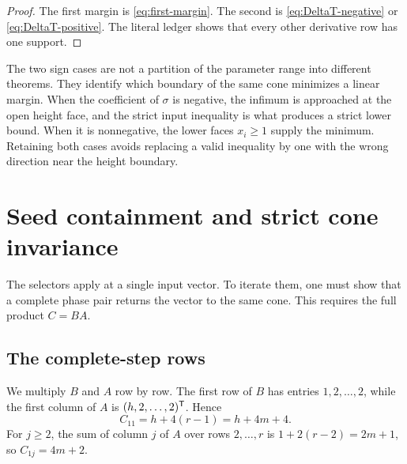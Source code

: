 \documentclass[11pt]{article}
\theoremstyle{remark}
\numberwithin{equation}{section}
\begin{document}
\begin{proof}
The first margin is \eqref{eq:first-margin}.  The second is
\eqref{eq:DeltaT-negative} or \eqref{eq:DeltaT-positive}.  The literal
ledger shows that every other derivative row has one support.
\end{proof}

The two sign cases are not a partition of the parameter range into different
theorems.  They identify which boundary of the same cone minimizes a linear
margin.  When the coefficient of \(\sigma\) is negative, the infimum is
approached at the open height face, and the strict input inequality is what
produces a strict lower bound.  When it is nonnegative, the lower faces
\(x_i\geq1\) supply the minimum.  Retaining both cases avoids replacing a
valid inequality by one with the wrong direction near the height boundary.

\section{Seed containment and strict cone invariance}\label{sec:cone}

The selectors apply at a single input vector.  To iterate them, one must
show that a complete phase pair returns the vector to the same cone.  This
requires the full product \(C=BA\).

\subsection{The complete-step rows}

We multiply \(B\) and \(A\) row by row.  The first row of \(B\) has entries
\(1,2,\ldots,2\), while the first column of \(A\) is
\((h,2,\ldots,2)^{\mathsf{T}}\).  Hence
\[
C_{11}=h+4(r-1)=h+4m+4.
\]
For \(j\geq2\), the sum of column \(j\) of \(A\) over rows
\(2,\ldots,r\) is \(1+2(r-2)=2m+1\), so \(C_{1j}=4m+2\).
\end{document}
